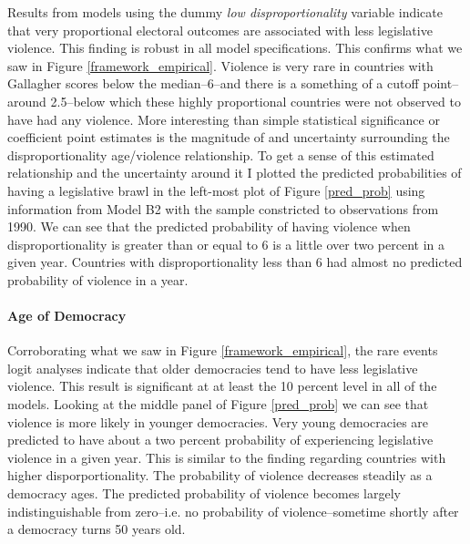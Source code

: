\documentclass[a4paper]{article}\usepackage{graphicx, color}
\begin{document}
Results from models using the dummy {\emph{low disproportionality}} variable indicate that very proportional electoral outcomes are associated with less legislative violence. This finding is robust in all model specifications. This confirms what we saw in Figure \ref{framework_empirical}. Violence is very rare in countries with Gallagher scores below the median--6--and there is a something of a cutoff point--around 2.5--below which these highly proportional countries were not observed to have had any violence. More interesting than simple statistical significance or coefficient point estimates is the magnitude of and uncertainty surrounding the disproportionality age/violence relationship. To get a sense of this estimated relationship and the uncertainty around it \citep[see][]{King2000} I plotted the predicted probabilities of having a legislative brawl in the left-most plot of Figure \ref{pred_prob} using information from Model B2 with the sample constricted to observations from 1990. We can see that the predicted probability of having violence when disproportionality is greater than or equal to 6 is a little over two percent in a given year. Countries with disproportionality less than 6 had almost no predicted probability of violence in a year.

\paragraph{Age of Democracy}

Corroborating what we saw in Figure \ref{framework_empirical}, the rare events logit analyses indicate that older democracies tend to have less legislative violence. This result is significant at at least the 10 percent level in all of the models. Looking at the middle panel of Figure \ref{pred_prob} we can see that violence is more likely in younger democracies. Very young democracies are predicted to have about a two percent probability of experiencing legislative violence in a given year. This is similar to the finding regarding countries with higher disporportionality. The probability of violence decreases steadily as a democracy ages. The predicted probability of violence becomes largely indistinguishable from zero--i.e. no probability of violence--sometime shortly after a democracy turns 50 years old.
\end{document}
